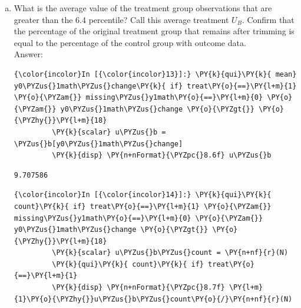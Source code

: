 \documentclass[11pt,notitlepage]{article}\usepackage[]{graphicx}\usepackage[]{color}
\makeatletter
\newenvironment{kframe}{%
 \def\at@end@of@kframe{}%
 \ifinner\ifhmode%
  \def\at@end@of@kframe{\end{minipage}}%
  \begin{minipage}{\columnwidth}%
 \fi\fi%
 \def\FrameCommand##1{\hskip\@totalleftmargin \hskip-\fboxsep
 \colorbox{shadecolor}{##1}\hskip-\fboxsep
     \hskip-\linewidth \hskip-\@totalleftmargin \hskip\columnwidth}%
 \MakeFramed {\advance\hsize-\width
   \@totalleftmargin\z@ \linewidth\hsize
   \@setminipage}}%
 {\par\unskip\endMakeFramed%
 \at@end@of@kframe}
\newenvironment{knitrout}{}{} %
\makeatother
\begin{document}
\begin{enumerate}[a)]
\begin{knitrout}
\begin{kframe}
\begin{Verbatim}[commandchars=\\\{\}]
                                                       -- Binom. Interp. --
    Variable |       Obs  Percentile    Centile        [95\% Conf. Interval]
-------------+-------------------------------------------------------------
y0\_1math\_c\textasciitilde{}e |       781        6.4         -18             -21         -16

    \end{Verbatim}
\end{kframe}
\end{knitrout}
The 6.4 percentile value is -18. 

\item What is the average value of the treatment group observations that are greater than the 6.4 percentile? Call this average treatment $U_B$. Confirm that the percentage of the original treatment group that remains after trimming is equal to the percentage of the control group with outcome data.\\
Answer:\\

\begin{knitrout}
\color{fgcolor}\begin{kframe}
   \begin{Verbatim}[commandchars=\\\{\}]
{\color{incolor}In [{\color{incolor}13}]:} \PY{k}{qui}\PY{k}{ mean} y0\PYZus{}1math\PYZus{}change\PY{k}{ if} treat\PY{o}{==}\PY{l+m}{1} \PY{o}{\PYZam{}} missing\PYZus{}y1math\PY{o}{==}\PY{l+m}{0} \PY{o}{\PYZam{}} y0\PYZus{}1math\PYZus{}change \PY{o}{\PYZgt{}} \PY{o}{\PYZhy{}}\PY{l+m}{18}
         \PY{k}{scalar} u\PYZus{}b = \PYZus{}b[y0\PYZus{}1math\PYZus{}change]
         \PY{k}{disp} \PY{n+nFormat}{\PYZpc{}8.6f} u\PYZus{}b
\end{Verbatim}

    \begin{Verbatim}[commandchars=\\\{\}]
9.707586

    \end{Verbatim}

    \begin{Verbatim}[commandchars=\\\{\}]
{\color{incolor}In [{\color{incolor}14}]:} \PY{k}{qui}\PY{k}{ count}\PY{k}{ if} treat\PY{o}{==}\PY{l+m}{1} \PY{o}{\PYZam{}} missing\PYZus{}y1math\PY{o}{==}\PY{l+m}{0} \PY{o}{\PYZam{}} y0\PYZus{}1math\PYZus{}change \PY{o}{\PYZgt{}} \PY{o}{\PYZhy{}}\PY{l+m}{18}
         \PY{k}{scalar} u\PYZus{}b\PYZus{}count = \PY{n+nf}{r}(N)
         \PY{k}{qui}\PY{k}{ count}\PY{k}{ if} treat\PY{o}{==}\PY{l+m}{1}
         \PY{k}{disp} \PY{n+nFormat}{\PYZpc{}8.7f} \PY{l+m}{1}\PY{o}{\PYZhy{}}u\PYZus{}b\PYZus{}count\PY{o}{/}\PY{n+nf}{r}(N)
\end{Verbatim}


\end{kframe}
\end{knitrout}
\end{enumerate}
\end{document}
